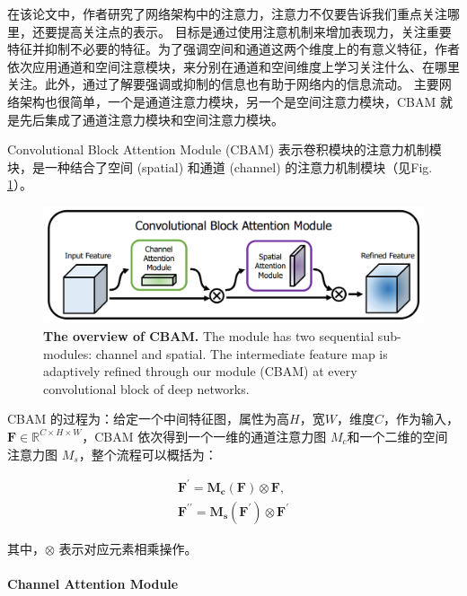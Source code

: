\documentclass[a4paper]{ctexart}
\begin{document}
	在该论文中，作者研究了网络架构中的注意力，注意力不仅要告诉我们重点关注哪里，还要提高关注点的表示。 目标是通过使用注意机制来增加表现力，关注重要特征并抑制不必要的特征。为了强调空间和通道这两个维度上的有意义特征，作者依次应用通道和空间注意模块，来分别在通道和空间维度上学习关注什么、在哪里关注。此外，通过了解要强调或抑制的信息也有助于网络内的信息流动。
	主要网络架构也很简单，一个是通道注意力模块，另一个是空间注意力模块，CBAM 就是先后集成了通道注意力模块和空间注意力模块。
	
	Convolutional Block Attention Module (CBAM) 表示卷积模块的注意力机制模块，是一种结合了空间 (spatial) 和通道 (channel) 的注意力机制模块（见Fig. \ref{fig: CBAM-overview}）。
	
	\begin{figure}[htbp]
		\centering 
		\includegraphics[width=0.7\columnwidth]{picture/LLIE/CBAM/CBAM-overview}
		\caption{
			\label{fig: CBAM-overview} 
			\textbf{The overview of CBAM.} The module has two sequential sub-modules:
			channel and spatial. The intermediate feature map is adaptively refined through
			our module (CBAM) at every convolutional block of deep networks.
		}
	\end{figure}
	
	CBAM 的过程为：给定一个中间特征图，属性为高$H$，宽$W$，维度$C$，作为输入，$\mathbf{F} \in \mathbb{R}^{C \times H \times W}$，CBAM 依次得到一个一维的通道注意力图 $M_c$和一个二维的空间注意力图 $M_s$，整个流程可以概括为： 
	
	\begin{equation}
		\begin{aligned}
			\mathbf{F}^{\prime} = \mathbf{M_c}(\mathbf{F}) \otimes \mathbf{F}, \\
			\mathbf{F}^{\prime\prime} = \mathbf{M_s}(\mathbf{F}^{\prime}) \otimes \mathbf{F}^{\prime}
		\end{aligned}
		\label{eq: CBAM}
	\end{equation}
	
	其中，$\otimes$ 表示对应元素相乘操作。
	
	\paragraph{Channel Attention Module}
	
\end{document}
